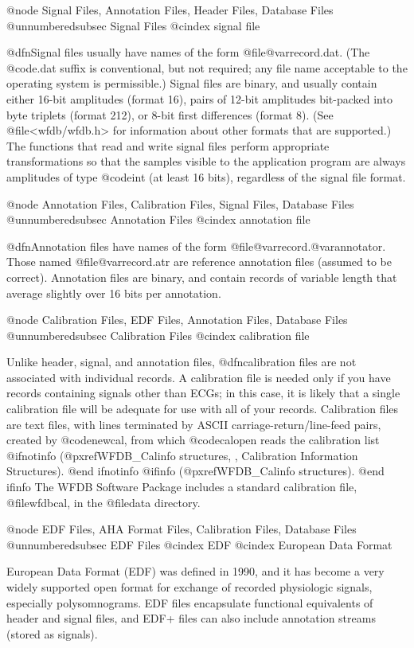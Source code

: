 {{{{{{{{{@node     Signal Files, Annotation Files, Header Files, Database Files
@unnumberedsubsec Signal Files
@cindex signal file

@dfn{Signal files} usually have names of the form
@file{@var{record}.dat}.  (The @code{.dat} suffix is conventional, but
not required; any file name acceptable to the operating system is
permissible.)  Signal files are binary, and usually contain either
16-bit amplitudes (format 16), pairs of 12-bit amplitudes bit-packed
into byte triplets (format 212), or 8-bit first differences (format 8).
(See @file{<wfdb/wfdb.h>} for information about other formats that are
supported.)  The functions that read and write signal files perform
appropriate transformations so that the samples visible to the
application program are always amplitudes of type @code{int} (at least
16 bits), regardless of the signal file format.

@node     Annotation Files, Calibration Files, Signal Files, Database Files
@unnumberedsubsec Annotation Files
@cindex annotation file

@dfn{Annotation files} have names of the form
@file{@var{record}.@var{annotator}}.  Those named
@file{@var{record}.atr} are reference annotation files (assumed to be
correct).  Annotation files are binary, and contain records of variable
length that average slightly over 16 bits per annotation.

@node     Calibration Files, EDF Files, Annotation Files, Database Files
@unnumberedsubsec Calibration Files
@cindex calibration file

Unlike header, signal, and annotation files, @dfn{calibration files} are
not associated with individual records.  A calibration file is needed
only if you have records containing signals other than ECGs;  in this
case, it is likely that a single calibration file will be adequate for use
with all of your records.  Calibration files are text files, with lines
terminated by ASCII carriage-return/line-feed pairs, created by
@code{newcal}, from which @code{calopen} reads the calibration list
@ifnotinfo
(@pxref{WFDB_Calinfo structures, , Calibration Information Structures}).
@end ifnotinfo
@ifinfo
(@pxref{WFDB_Calinfo structures}).
@end ifinfo
The WFDB Software Package includes a standard calibration file,
@file{wfdbcal}, in the @file{data} directory.

@node     EDF Files, AHA Format Files, Calibration Files, Database Files
@unnumberedsubsec EDF Files
@cindex EDF
@cindex European Data Format

European Data Format (EDF) was defined in 1990, and it has become a very
widely supported open format for exchange of recorded physiologic signals,
especially polysomnograms. EDF files encapsulate functional equivalents of
header and signal files, and EDF+ files can also include annotation streams
(stored as signals).

}}}}}}}}}
